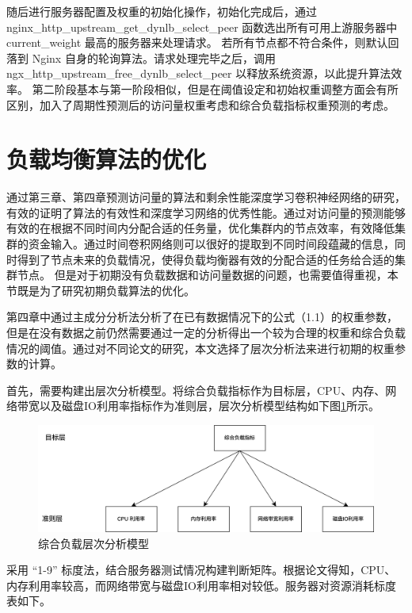 随后进行服务器配置及权重的初始化操作，初始化完成后，通过 nginx\_http\_upstream\_get\_dynlb\_select\_peer 
函数选出所有可用上游服务器中 current\_weight 最高的服务器来处理请求。
若所有节点都不符合条件，则默认回落到 Nginx 自身的轮询算法。请求处理完毕之后，调用 ngx\_http\_upstream\_free\_dynlb\_select\_peer 以释放系统资源，以此提升算法效率。
第二阶段基本与第一阶段相似，但是在阈值设定和初始权重调整方面会有所区别，加入了周期性预测后的访问量权重考虑和综合负载指标权重预测的考虑。

\section{负载均衡算法的优化}
通过第三章、第四章预测访问量的算法和剩余性能深度学习卷积神经网络的研究，有效的证明了算法的有效性和深度学习网络的优秀性能。通过对访问量的预测能够有效的在根据不同时间内分配合适的任务量，优化集群内的节点效率，有效降低集群的资金输入。通过时间卷积网络则可以很好的提取到不同时间段蕴藏的信息，同时得到了节点未来的负载情况，使得负载均衡器有效的分配合适的任务给合适的集群节点。
但是对于初期没有负载数据和访问量数据的问题，也需要值得重视，本节既是为了研究初期负载算法的优化。

第四章中通过主成分分析法分析了在已有数据情况下的公式（1.1）的权重参数，但是在没有数据之前仍然需要通过一定的分析得出一个较为合理的权重和综合负载情况的阈值。通过对不同论文的研究\cite{吴文辉2013编程计算层次分析法}，本文选择了层次分析法来进行初期的权重参数的计算。

首先，需要构建出层次分析模型。将综合负载指标作为目标层，CPU、内存、网络带宽以及磁盘IO利用率指标作为准则层，层次分析模型结构如下图\ref{Layered_Analysis}所示。

\begin{figure}[htbp]
  \centering
  \includegraphics[width=\textwidth]{figures/Layered_Analysis.jpg}
  \caption{综合负载层次分析模型}
  \label{Layered_Analysis}
\end{figure}

采用 “1-9” 标度法，结合服务器测试情况构建判断矩阵。根据论文得知，CPU、内存利用率较高，而网络带宽与磁盘IO利用率相对较低\cite{吴陈2020基于Nginx的服务器集群负载均衡策略的研究与改进}。服务器对资源消耗标度表如下。

